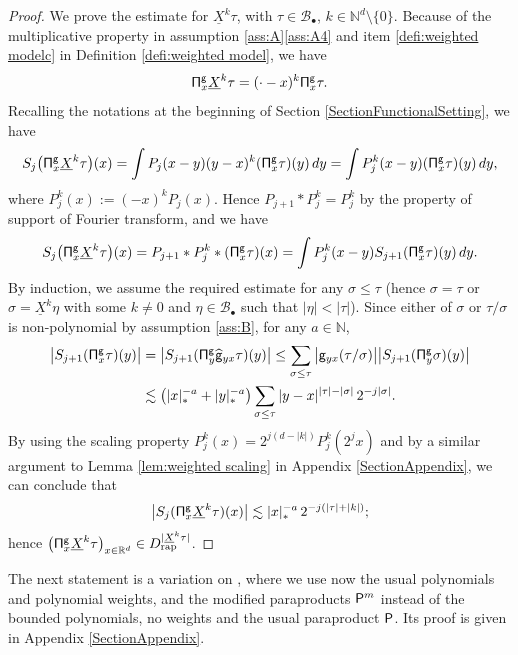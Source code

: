 \documentclass[11pt]{article}
\numberwithin{equation}{section}
\newcommand{\sbullet}{{\scriptscriptstyle\bullet}}
\theoremstyle{plain}
\theoremstyle{definition}
\newcommand{\rap}{\mathrm{rap}}
\newcommand{\sfg}{\mathsf{g}}
\newcommand{\bbN}{\mathbb{N}}
\newcommand{\bbR}{\mathbb{R}}
\newcommand{\mcB}{\mathcal{B}}
\begin{document}
\begin{proof}
We prove the estimate for $\underline{X}^k\tau$, with $\tau\in\mcB_\sbullet$, $k\in\bbN^d\setminus\{0\}$. Because of the multiplicative property in assumption \ref{ass:A}\eqref{ass:A4} and item \eqref{defi:weighted modelc} in Definition \ref{defi:weighted model}, we have
\[
{\sf\Pi}_x^{\sfg}\underline{X}^k\tau=(\cdot-x)^k{\sf\Pi}_x^{\sfg}\tau.
\]
Recalling the notations at the beginning of Section \ref{SectionFunctionalSetting}, we have
\begin{align*}
S_j\bigl({\sf\Pi}_x^{\sfg}\underline{X}^k\tau\bigr)(x)
= \int P_j(x-y)(y-x)^k({\sf\Pi}_x^{\sfg}\tau)(y)\,dy
= \int P_j^{k}(x-y)({\sf\Pi}_x^{\sfg}\tau)(y)\,dy,
\end{align*}
where $P_j^k(x):=(-x)^kP_j(x)$. Hence $P_{j+1}*P_j^k=P_j^k$ by the property of support of Fourier transform, and we have
\begin{align*}
S_j\bigl({\sf\Pi}_x^{\sfg}\underline{X}^k\tau\bigr)(x) = P_{j+1}*P_j^k*({\sf\Pi}_x^{\sfg}\tau)(x) = \int P_j^k(x-y)S_{j+1}({\sf\Pi}_x^{\sfg}\tau)(y)\,dy.
\end{align*}
By induction, we assume the required estimate for any $\sigma\le\tau$ (hence $\sigma=\tau$ or $\sigma=\underline{X}^k\eta$ with some $k\neq0$ and $\eta\in\mcB_\sbullet$ such that $|\eta|<|\tau|$).
Since either of $\sigma$ or $\tau/\sigma$ is non-polynomial by assumption \eqref{ass:B}, for any $a\in\bbN$,
\begin{align*}
\big|S_{j+1}({\sf\Pi}_x^{\sfg}\tau)(y)\big| &= \big|S_{j+1}({\sf\Pi}_y^{\sfg}\widehat{\sfg}_{yx}\tau)(y) \big|
\le\sum_{\sigma\le\tau} \big|\sfg_{yx}(\tau/\sigma)\big| \big|S_{j+1}({\sf\Pi}_y^{\sfg}\sigma)(y)\big| \\
&\lesssim \bigl(|x|_*^{-a}+|y|_*^{-a}\bigr) \sum_{\sigma\le\tau}|y-x|^{|\tau|-|\sigma|}\,2^{-j|\sigma|}.
\end{align*}
By using the scaling property $P_j^k(x)=2^{j(d-|k|)}P_j^k(2^jx)$ and by a similar argument to Lemma \ref{lem:weighted scaling} in Appendix \ref{SectionAppendix}, we can conclude that
\begin{align*}
\big|S_j({\sf\Pi}_x^{\sfg}\underline{X}^k\tau)(x)\big| \lesssim |x|_*^{-a}\,2^{-j(|\tau|+|k|)};
\end{align*}
hence $\bigl({\sf\Pi}_x^{\sfg}\underline{X}^k\tau\bigr)_{x\in\bbR^d}\in D_{\rap}^{|\underline{X}^k\tau|}$.
\end{proof}

The next statement is a variation on \cite[Prop.\,12]{BH}, where we use now the usual polynomials and polynomial weights, and the modified paraproducts ${\sf P}^m$ instead of the bounded polynomials, no weights and the usual paraproduct $\sf P$. Its proof is given in Appendix \ref{SectionAppendix}.
\end{document}
